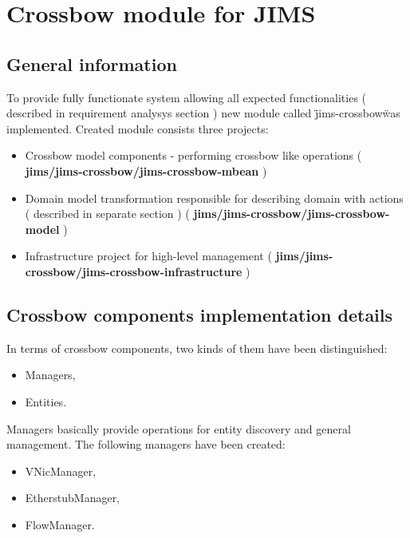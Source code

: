 \documentclass[11pt]{book}
\begin{document}
	  \section{Crossbow module for JIMS}
		\label{sec:impl:module}
	
		\subsection{General information}
			\label{sec:impl:general}
		
			To provide fully functionate system allowing all expected functionalities ( described in requirement analysys section )
			new module called \"jims-crossbow\" was implemented. Created module consists three projects:
			\begin{itemize}
				\item{Crossbow model components - performing crossbow like operations ( \textbf{jims/jims-crossbow/jims-crossbow-mbean} )}
				\item{Domain model transformation responsible for describing domain with actions 
					( described in separate section ) ( \textbf{jims/jims-crossbow/jims-crossbow-model} )}
				\item{Infrastructure project for high-level management ( \textbf{jims/jims-crossbow/jims-crossbow-infrastructure} )}
			\end{itemize}
		
		\subsection{Crossbow components implementation details}
			\label{sec:impl:comp}
	
		In terms of crossbow components, two kinds of them have been distinguished:

		\begin{itemize}
			\item Managers,
			\item Entities.
		\end{itemize}

		Managers basically provide operations for entity discovery and general management. The following managers have
		been created:

		\begin{itemize}
			\item VNicManager,
			\item EtherstubManager,
			\item FlowManager.
		\end{itemize}
\end{document}

